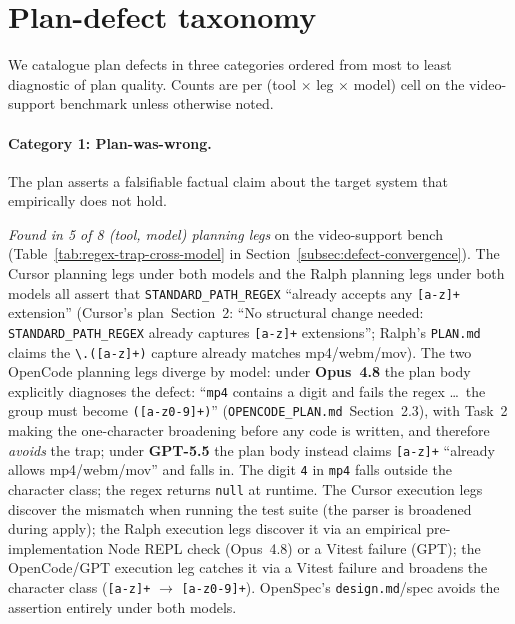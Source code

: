\section{Plan-defect taxonomy}
\label{app:defect}

We catalogue plan defects in three categories ordered from most to
least diagnostic of plan quality. Counts are per
(tool $\times$ leg $\times$ model) cell on the video-support benchmark
unless otherwise noted.

\paragraph{Category 1: Plan-was-wrong.}
The plan asserts a falsifiable factual claim about the target system
that empirically does not hold.

\emph{Found in 5 of 8 (tool, model) planning legs} on the video-support
bench (Table~\ref{tab:regex-trap-cross-model} in
Section~\ref{subsec:defect-convergence}). The Cursor planning legs
under both models and the Ralph planning legs under both models all
assert that \texttt{STANDARD\_PATH\_REGEX} ``already accepts any
\texttt{[a-z]+} extension'' (Cursor's plan~Section~2: ``No structural
change needed: \texttt{STANDARD\_PATH\_REGEX} already captures
\texttt{[a-z]+} extensions''; Ralph's \texttt{PLAN.md} claims the
\texttt{\textbackslash.([a-z]+)} capture already matches
mp4/webm/mov). The two OpenCode planning legs diverge by model: under
\textbf{Opus~4.8} the plan body explicitly diagnoses the defect:
``\texttt{mp4} contains a digit and fails the regex \ldots\ the group
must become \texttt{([a-z0-9]+)}'' (\texttt{OPENCODE\_PLAN.md}~Section~2.3),
with Task~2 making the one-character broadening before any code is
written, and therefore \emph{avoids} the trap; under \textbf{GPT-5.5}
the plan body instead claims \texttt{[a-z]+} ``already allows
mp4/webm/mov'' and falls in. The digit \texttt{4} in \texttt{mp4}
falls outside the character class; the regex returns \texttt{null} at
runtime. The Cursor execution legs discover the mismatch when running
the test suite (the parser is broadened during apply); the Ralph
execution legs discover it via an empirical pre-implementation Node
REPL check (Opus~4.8) or a Vitest failure (GPT); the OpenCode/GPT
execution leg catches it via a Vitest failure and broadens the
character class (\texttt{[a-z]+} $\to$ \texttt{[a-z0-9]+}). OpenSpec's
\texttt{design.md}/spec avoids the assertion entirely under both
models.

